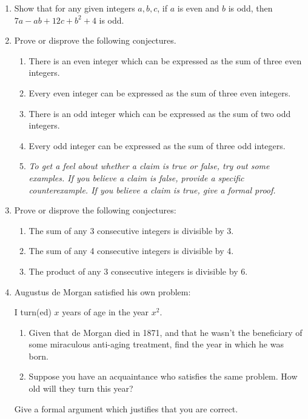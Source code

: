\begin{exercises}{}{}

\begin{enumerate}\renewcommand{\labelenumi}{\thesubsection.\theenumi}
	\item Show that for any given integers $a,b,c$, if $a$ is even and $b$ is odd, then $7a-ab+12c+b^2+4$ is odd.\goodbreak

  \item Prove or disprove the following conjectures.
	\begin{enumerate}
	  \item There is an even integer which can be expressed as the sum of three even integers.
	  \item Every even integer can be expressed as the sum of three even integers. 
	  \item There is an odd integer which can be expressed as the sum of two odd integers.
	  \item Every odd integer can be expressed as the sum of three odd integers.
		\item[]\emph{To get a feel about whether a claim is true or false, try out some examples. If you believe a claim is false, provide a specific counterexample. If you believe a claim is true, give a formal proof.}
\end{enumerate}

  \item Prove or disprove the following conjectures:
	\begin{enumerate}
	  \item The sum of any 3 consecutive integers is divisible by 3.
	  \item The sum of any 4 consecutive integers is divisible by 4.
	  \item The product of any 3 consecutive integers is divisible by 6.
	\end{enumerate}

  \item Augustus de Morgan satisfied his own problem:
	\begin{center}
	I turn(ed) $x$ years of age in the year $x^2$.
	\end{center}
	\begin{enumerate}
	  \item Given that de Morgan died in 1871, and that he wasn't the beneficiary of some miraculous anti-aging treatment, find the year in which he was born.
	  \item Suppose you have an acquaintance who satisfies the same problem. How old will they turn this year?
	\end{enumerate}%
	Give a formal argument which justifies that you are correct.
	

\end{enumerate}
\end{exercises}

